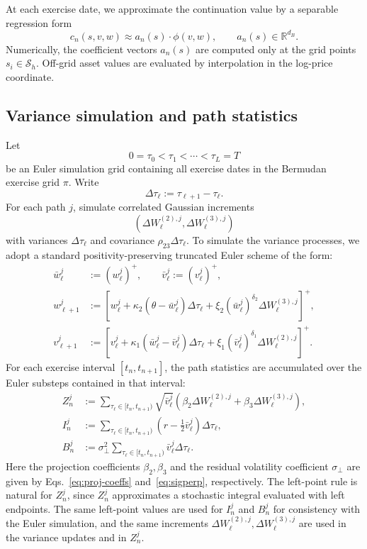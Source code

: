 \documentclass[pdflatex,sn-mathphys-num]{sn-jnl}
\theoremstyle{thmstyleone}%
\theoremstyle{thmstylethree}%
\theoremstyle{thmstyletwo}%
\newcommand{\R}{\mathbb R}
\begin{document}
At each exercise date, we approximate the continuation value by a separable
regression form
$$
c_n(s,v,w)\approx a_n(s)\cdot\phi(v,w),
\qquad
a_n(s)\in\R^{d_B}.
$$
Numerically, the coefficient vectors $a_n(s)$ are computed only at the grid points
$s_i\in\mathcal S_h$. Off-grid asset values are evaluated by interpolation in the
log-price coordinate.

\subsection{Variance simulation and path statistics}
Let
$$
0=\tau_0<\tau_1<\cdots<\tau_L=T
$$
be an Euler simulation grid containing all exercise dates in the Bermudan exercise grid $\pi$. Write
$$
\Delta\tau_\ell:=\tau_{\ell+1}-\tau_\ell.
$$
For each path $j$, simulate correlated Gaussian increments
$$
(\Delta W_{\ell}^{(2),j},\Delta W_{\ell}^{(3),j})
$$
with variances $\Delta\tau_\ell$ and covariance
$\rho_{23}\Delta\tau_\ell$. To simulate the variance processes, we adopt a standard positivity-preserving truncated Euler scheme of the form:
$$
\begin{aligned}
\bar w_\ell^j&:=(w_\ell^j)^+,
\qquad
\bar v_\ell^j:=(v_\ell^j)^+,\\
w_{\ell+1}^j
&:=
\left[
w_\ell^j+\kappa_2(\theta-\bar w_\ell^j)\Delta\tau_\ell
+\xi_2(\bar w_\ell^j)^{\delta_2}\Delta W_{\ell}^{(3),j}
\right]^+,\\
v_{\ell+1}^j
&:=
\left[
v_\ell^j+\kappa_1(\bar w_\ell^j-\bar v_\ell^j)\Delta\tau_\ell
+\xi_1(\bar v_\ell^j)^{\delta_1}\Delta W_{\ell}^{(2),j}
\right]^+.
\end{aligned}
$$
For each exercise interval $[t_n,t_{n+1}]$, the path statistics are accumulated
over the Euler substeps contained in that interval:
$$
\begin{aligned}
Z_n^j
&:=
\sum_{\tau_\ell\in[t_n,t_{n+1})}
\sqrt{\bar v_\ell^j}
\left(
\beta_2\Delta W_{\ell}^{(2),j}
+
\beta_3\Delta W_{\ell}^{(3),j}
\right),\\
I_n^j
&:=
\sum_{\tau_\ell\in[t_n,t_{n+1})}
\left(r-\frac12\bar v_\ell^j\right)\Delta\tau_\ell,\\
B_n^j
&:=
\sigma_\perp^2
\sum_{\tau_\ell\in[t_n,t_{n+1})}
\bar v_\ell^j\Delta\tau_\ell .
\end{aligned}
$$
Here the projection coefficients $\beta_2,\beta_3$ and the residual volatility coefficient $\sigma_\perp$ are given by Eqs.~\eqref{eq:proj-coeffs} and~\eqref{eq:sigperp}, respectively. The left-point rule is natural for $Z_n^j$, since $Z_n^j$ approximates a stochastic integral evaluated with left endpoints. The same left-point values are used for $I_n^j$ and $B_n^j$ for consistency with the Euler  simulation, and the same increments $\Delta W_{\ell}^{(2),j},\Delta W_{\ell}^{(3),j}$ are used in the variance updates and in $Z_n^j$.
\end{document}
